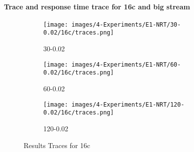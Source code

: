 \paragraph{Trace and response time trace for 16c and big stream\\}

\begin{figure}[H]
    \centering
    \begin{subfigure}[b]{\textwidth}
        \centering
        \texttt{[image: images/4-Experiments/E1-NRT/30-0.02/16c/traces.png]}
        \caption{30-0.02}
    \end{subfigure}
    
    \vspace{0.5cm} %
    \begin{subfigure}[b]{\textwidth}
        \centering
        \texttt{[image: images/4-Experiments/E1-NRT/60-0.02/16c/traces.png]}
        \caption{60-0.02}
    \end{subfigure}
    
    \vspace{0.5cm} %
    \begin{subfigure}[b]{\textwidth}
        \centering
        \texttt{[image: images/4-Experiments/E1-NRT/120-0.02/16c/traces.png]}
        \caption{120-0.02}
    \end{subfigure}

    \caption{Results Traces for 16c}
    \label{img:exps-small-traces-16c}
\end{figure}

